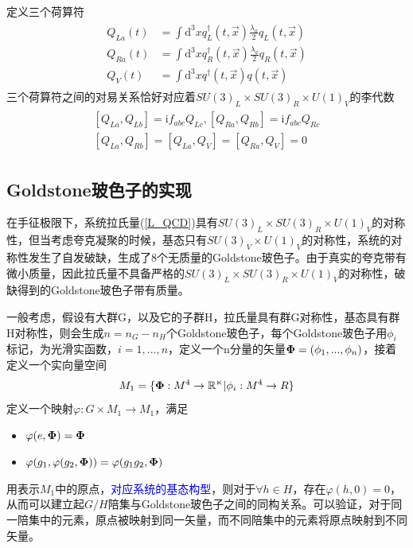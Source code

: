 \documentclass[aps,tightenlines,16pt]{ctexart}
\numberwithin{equation}{section}
\newcommand{\bm}[1]{\mbox{\boldmath{$#1$}}}
\begin{document}
定义三个荷算符
\begin{align}
   \begin{aligned}
      Q_{La}(t) &= \int \mbox{d}^3x q_L^{\dagger}(t,\vec{x}) \frac{\lambda_a}{2}q_L(t,\vec{x})\\
      Q_{Ra}(t) &= \int \mbox{d}^3x q_R^{\dagger}(t,\vec{x}) \frac{\lambda_a}{2}q_R(t,\vec{x})\\
      Q_{V}(t) &= \int \mbox{d}^3x q^{\dagger}(t,\vec{x}) q(t,\vec{x})
   \end{aligned}   
\end{align}
三个荷算符之间的对易关系恰好对应着$SU(3)_L\times SU(3)_R\times U(1)_V$的李代数
\begin{align}
   \begin{aligned}
      [Q_{La},Q_{Lb}]=\mbox{i}f_{abc}Q_{Lc}, [Q_{Ra},Q_{Rb}]=\mbox{i}f_{abc}Q_{Rc}\\
      [Q_{La},Q_{Rb}]=[Q_{La},Q_V]=[Q_{Ra},Q_V]=0
   \end{aligned}
\end{align}



\subsection{Goldstone玻色子的实现}
在手征极限下，系统拉氏量(\ref*{L_QCD})具有$SU(3)_L\times SU(3)_R \times U(1)_V$的对称性，但当考虑夸克凝聚的时候，基态只有$SU(3)_V \times U(1)_V$的对称性，系统的对称性发生了自发破缺，生成了8个无质量的Goldstone玻色子。由于真实的夸克带有微小质量，因此拉氏量不具备严格的$SU(3)_L\times SU(3)_R \times U(1)_V$的对称性，破缺得到的Goldstone玻色子带有质量。

一般考虑，假设有大群G，以及它的子群H，拉氏量具有群G对称性，基态具有群H对称性，则会生成$n=n_G-n_H$个Goldstone玻色子，每个Goldstone玻色子用$\phi_i$标记，为光滑实函数，$i=1,...,n$，定义一个n分量的矢量$\bm{\Phi}=(\phi_1,...,\phi_n)$，接着定义一个实向量空间
\begin{align}
   M_1 = \{\bm{\Phi}:M^4 \to \mathbb{R^n}| \phi_i: M^4\to R\}
\end{align}
定义一个映射$\varphi : G \times M_1 \to M_1$，满足
\begin{itemize}
   \item 
   $\varphi(e,\bm{\Phi})=\bm{\Phi}$
   \item 
   $\varphi(g_1,\varphi(g_2,\bm{\Phi}))=\varphi(g_1 g_2 ,\bm{\Phi})$
\end{itemize}
用\bm{\Phi}表示$M_1$中的原点，\textcolor{blue}{对应系统的基态构型}，则对于$\forall h \in H$，存在$\varphi(h,0)=0$，从而可以建立起$G/H$陪集与Goldstone玻色子之间的同构关系。可以验证，对于同一陪集中的元素，原点被映射到同一矢量，而不同陪集中的元素将原点映射到不同矢量。
\end{document}
